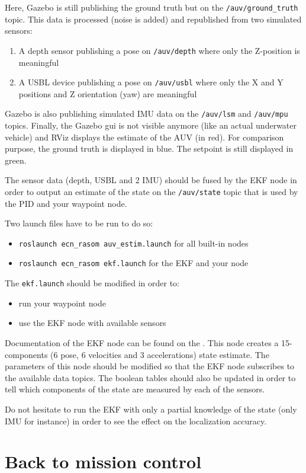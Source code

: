 \documentclass{ecnreport}
\begin{document}
Here, Gazebo is still publishing the ground truth but on the \texttt{/auv/ground\_truth} topic. This data is processed (noise is added) and republished from two simulated sensors:
\begin{enumerate}
  \item A depth sensor publishing a pose on \texttt{/auv/depth} where only the Z-position is meaningful
  \item A USBL device publishing a pose on \texttt{/auv/usbl} where only the X and Y positions and Z orientation (yaw) are meaningful
\end{enumerate}
Gazebo is also publishing simulated IMU data on the \texttt{/auv/lsm} and \texttt{/auv/mpu} topics. 
Finally, the Gazebo gui is not visible anymore (like an actual underwater vehicle) and RViz displays the estimate of the AUV (in red). 
For comparison purpose, the ground truth is displayed in blue. The setpoint is still displayed in green.

The sensor data (depth, USBL and 2 IMU) should be fused by the EKF node in order to output an estimate of the state on the \texttt{/auv/state} topic that is used by the PID and your waypoint node.

Two launch files have to be run to do so:
\begin{itemize}
 \item \texttt{roslaunch ecn\_rasom auv\_estim.launch} for all built-in nodes
 \item \texttt{roslaunch ecn\_rasom ekf.launch} for the EKF and your node
\end{itemize}

The \texttt{ekf.launch} should be modified in order to:
\begin{itemize}
 \item run your waypoint node
 \item use the EKF node with available sensors
\end{itemize}
Documentation of the EKF node can be found on the .
This node creates a 15-components (6 pose, 6 velocities and 3 accelerations) state estimate.
The parameters of this node should be modified so that the EKF node
subscribes to the available data topics. The boolean tables should
also be updated in order to tell which components of the state are measured by each of the sensors. 

Do not hesitate to run the EKF with only a partial knowledge of the state (only IMU for instance) in order to see the effect on the localization accuracy.

\section{Back to mission control}
\end{document}
